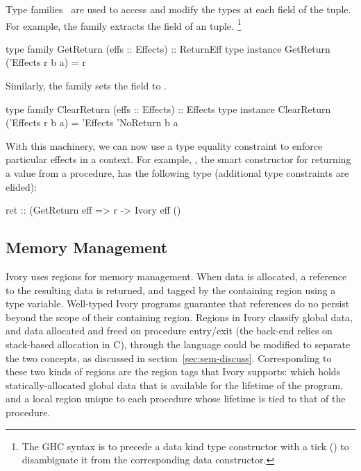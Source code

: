 Type families~\cite{typefamilies} are used to access and modify the types at each field of
the tuple. For example, the  family extracts the 
field of an  tuple.
\footnote{The GHC syntax is to precede a data kind type constructor with a tick ()
to disambiguate it from the corresponding data constructor.}

\begin{code}
type family   GetReturn (effs :: Effects) :: ReturnEff
type instance GetReturn ('Effects r b a) = r
\end{code}

\noindent
Similarly, the  family sets the  field to .

\begin{code}
type family   ClearReturn (effs :: Effects) :: Effects
type instance ClearReturn ('Effects r b a) =
  'Effects 'NoReturn b a
\end{code}

With this machinery, we can now use a type equality constraint to enforce
particular effects in a context. For example, , the smart
constructor for returning a value from a procedure, has the following type
(additional type constraints are elided):

\begin{code}
ret :: (GetReturn eff %
    => r -> Ivory eff ()
\end{code}

\subsection{Memory Management}
\label{sec:ref}

Ivory uses regions for memory management.  When data is allocated, a reference
to the resulting data is returned, and tagged by the containing region using a
type variable.  Well-typed Ivory programs guarantee that references do no
persist beyond the scope of their containing region.  Regions in Ivory classify
global data, and data allocated and freed on procedure entry/exit (the back-end
relies on stack-based allocation in C), through the language could be modified
to separate the two concepts, as discussed in section~\ref{sec:sem-discuss}.
Corresponding to these two kinds of regions are the region tags that Ivory
supports:  which holds statically-allocated global data that is
available for the lifetime of the program, and a local region unique to each
procedure whose lifetime is tied to that of the procedure.

